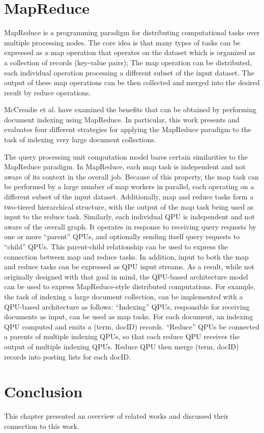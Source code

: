 \section{MapReduce}
\label{sec:mapreduce}
MapReduce \cite{dean:mapreduce} is a programming paradigm for distributing computational tasks over multiple processing nodes.
The core idea is that many types of tasks can be expressed as a map operation that operates on the dataset which is organized
as a collection of records (key-value pairs);
The map operation can be distributed, each individual operation processing a different subset of the input dataset.
The output of these map operations can be then collected and merged into the desired result by reduce operations.

McCreadie et al. \cite{mccreadie:mapreduceindexing} have examined the benefits that can be obtained by performing document
indexing using MapReduce.
In particular, this work presents and evaluates four different strategies for applying the MapReduce paradigm
to the task of indexing very large document collections.

The query processing unit computation model bares certain similarities to the MapReduce paradigm.
In MapReduce, each map task is independent and not aware of its context in the overall job.
Because of this property, the map task can be performed by a large number of map workers in parallel,
each operating on a different subset of the input dataset.
Additionally, map and reduce tasks form a two-tiered hierarchical structure,
with the output of the map task being used as input to the reduce task.
Similarly, each individual QPU is independent and not aware of the overall graph.
It operates in response to receiving query requests by one or more ``parent'' QPUs,
and optionally sending itself query requests to ``child'' QPUs.
This parent-child relationship can be used to express the connection between map and reduce tasks.
In addition, input to both the map and reduce tasks can be expressed as QPU input streams.
As a result, while not originally designed with that goal in mind,
the QPU-based architecture model can be used to express MapReduce-style distributed computations.
For example, the task of indexing a large document collection, can be implemented with a QPU-based architecture
as follows:
``Indexing'' QPUs, responsible for receiving documents as input, can be used as map tasks.
For each document, an indexing QPU computed and emits a (term, docID) records.
``Reduce'' QPUs be connected a parents of multiple indexing QPUs,
so that each reduce QPU receives the output of multiple indexing QPUs.
Reduce QPU then merge (term, docID) records into posting lists for each docID.

\section{Conclusion}
This chapter presented an overview of related works and discussed their connection to this work.
